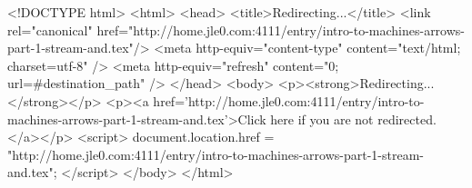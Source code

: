 <!DOCTYPE html>
<html>
<head>
<title>Redirecting...</title>
<link rel="canonical" href="http://home.jle0.com:4111/entry/intro-to-machines-arrows-part-1-stream-and.tex"/>
<meta http-equiv="content-type" content="text/html; charset=utf-8" />
<meta http-equiv="refresh" content="0; url=#{destination_path}" />
</head>
<body>
  <p><strong>Redirecting...</strong></p>
  <p><a href='http://home.jle0.com:4111/entry/intro-to-machines-arrows-part-1-stream-and.tex'>Click here if you are not redirected.</a></p>
  <script>
    document.location.href = "http://home.jle0.com:4111/entry/intro-to-machines-arrows-part-1-stream-and.tex";
  </script>
</body>
</html>
